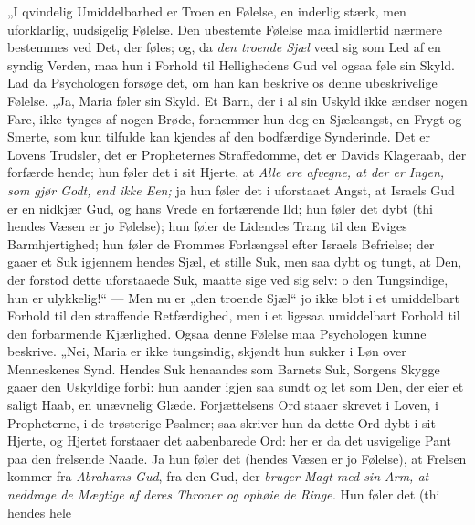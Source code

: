 \documentclass[12pt,a4paper]{book}
\begin{document}
„I qvindelig Umiddelbarhed er Troen en Følelse, en inderlig stærk, men
uforklarlig, uudsigelig Følelse. Den ubestemte Følelse maa imidlertid nærmere
bestemmes ved Det, der føles; og, da \emph{den troende Sjæl} veed sig som Led af
en syndig Verden, maa hun i Forhold til Hellighedens Gud vel ogsaa føle sin
Skyld. Lad da Psychologen forsøge det, om han kan beskrive os denne
ubeskrivelige Følelse. „Ja, Maria føler sin Skyld. Et Barn, der i al sin Uskyld
ikke ændser nogen Fare, ikke tynges af nogen Brøde, fornemmer hun dog en
Sjæleangst, en Frygt og Smerte, som kun tilfulde kan kjendes af den bodfærdige
Synderinde. Det er Lovens Trudsler, det er Propheternes Straffedomme, det er
Davids Klageraab, der forfærde hende; hun føler det i sit Hjerte, at
\emph{Alle ere afvegne, at der er Ingen, som gjør Godt, end ikke Een;} ja hun
føler det i uforstaaet Angst, at Israels Gud er en nidkjær Gud, og hans Vrede en
fortærende Ild; hun føler det dybt (thi hendes Væsen er jo Følelse); hun føler
de Lidendes Trang til den Eviges Barmhjertighed; hun føler de Frommes Forlængsel
efter Israels Befrielse; der gaaer et Suk igjennem hendes Sjæl, et stille Suk,
men saa dybt og tungt, at Den, der forstod dette uforstaaede Suk, maatte sige
ved sig selv: o den Tungsindige, hun er ulykkelig!“ --- Men nu er „den troende
Sjæl“ jo ikke blot i et umiddelbart Forhold til den straffende Retfærdighed, men
i et ligesaa umiddelbart Forhold til den forbarmende Kjærlighed. Ogsaa denne
Følelse maa Psychologen kunne beskrive.
„Nei, Maria er ikke tungsindig, skjøndt hun sukker i Løn over Menneskenes Synd.
Hendes Suk henaandes som Barnets Suk, Sorgens Skygge gaaer den Uskyldige forbi:
hun aander igjen saa sundt og let som Den, der eier et saligt Haab, en unævnelig
Glæde. Forjættelsens Ord staaer skrevet i Loven, i Propheterne, i de trøsterige
Psalmer; saa skriver hun da dette Ord dybt i sit Hjerte, og Hjertet forstaaer
det aabenbarede Ord: her er da det usvigelige Pant paa den frelsende Naade. Ja
hun føler det (hendes Væsen er jo Følelse), at Frelsen kommer fra
\emph{Abrahams Gud}, fra den Gud, der \emph{bruger Magt med sin Arm, at neddrage
de Mægtige af deres Throner og ophøie de Ringe.} Hun føler det (thi hendes hele
\end{document}
